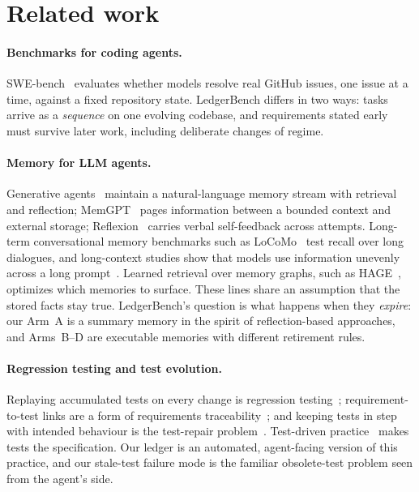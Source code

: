 \documentclass[11pt]{article}
\begin{document}
\section{Related work}
\label{sec:related}

\paragraph{Benchmarks for coding agents.} SWE-bench~\cite{swebench} evaluates
whether models resolve real GitHub issues, one issue at a time, against a fixed
repository state. LedgerBench differs in two ways: tasks arrive as a
\emph{sequence} on one evolving codebase, and requirements stated early must
survive later work, including deliberate changes of regime.

\paragraph{Memory for LLM agents.} Generative agents~\cite{generativeagents}
maintain a natural-language memory stream with retrieval and reflection;
MemGPT~\cite{memgpt} pages information between a bounded context and external
storage; Reflexion~\cite{reflexion} carries verbal self-feedback across
attempts. Long-term conversational memory benchmarks such as
LoCoMo~\cite{locomo} test recall over long dialogues, and long-context studies
show that models use information unevenly across a long
prompt~\cite{lostinmiddle}. Learned retrieval over memory graphs, such as
HAGE~\cite{hage2026}, optimizes which memories to surface. These lines share an
assumption that the stored facts stay true. LedgerBench's question is what
happens when they \emph{expire}: our Arm~A is a summary memory in the spirit of
reflection-based approaches, and Arms~B--D are executable memories with
different retirement rules.

\paragraph{Regression testing and test evolution.} Replaying accumulated tests
on every change is regression testing~\cite{yooharman}; requirement-to-test
links are a form of requirements traceability~\cite{gotel}; and keeping tests
in step with intended behaviour is the test-repair
problem~\cite{reassert}. Test-driven practice~\cite{beck} makes tests the
specification. Our ledger is an automated, agent-facing version of this
practice, and our stale-test failure mode is the familiar obsolete-test problem
seen from the agent's side.
\end{document}
